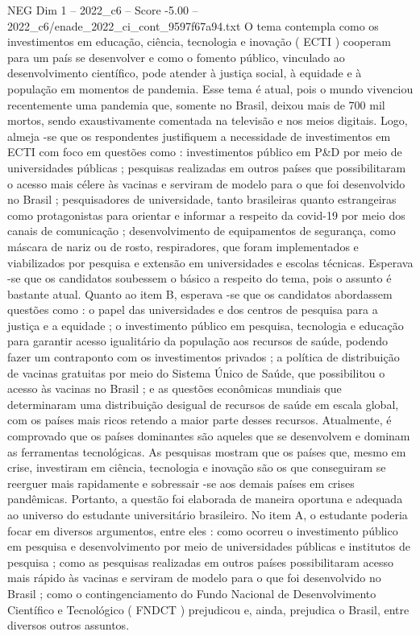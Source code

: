 \begin{textsample}{NEG Dim 1 – 2022\_c6 – Score -5.00 – 2022\_c6/enade\_2022\_ci\_cont\_9597f67a94.txt}
O tema contempla como os investimentos em educação, ciência, tecnologia e inovação ( ECTI ) cooperam para um país se desenvolver e como o fomento público, vinculado ao desenvolvimento científico, pode atender à justiça social, à equidade e à população em momentos de pandemia.
Esse tema é atual, pois o mundo vivenciou recentemente uma pandemia que, somente no Brasil, deixou mais de 700 mil mortos, sendo exaustivamente comentada na televisão e nos meios digitais.
Logo, almeja -se que os respondentes justifiquem a necessidade de investimentos em ECTI com foco em questões como : investimentos público em P\&D por meio de universidades públicas ; pesquisas realizadas em outros países que possibilitaram o acesso mais célere às vacinas e serviram de modelo para o que foi desenvolvido no Brasil ; pesquisadores de universidade, tanto brasileiras quanto estrangeiras como protagonistas para orientar e informar a respeito da covid-19 por meio dos canais de comunicação ; desenvolvimento de equipamentos de segurança, como máscara de nariz ou de rosto, respiradores, que foram implementados e viabilizados por pesquisa e extensão em universidades e escolas técnicas.
Esperava -se que os candidatos soubessem o básico a respeito do tema, pois o assunto é bastante atual.
Quanto ao item B, esperava -se que os candidatos abordassem questões como : o papel das universidades e dos centros de pesquisa para a justiça e a equidade ; o investimento público em pesquisa, tecnologia e educação para garantir acesso igualitário da população aos recursos de saúde, podendo fazer um contraponto com os investimentos privados ; a política de distribuição de vacinas gratuitas por meio do Sistema Único de Saúde, que possibilitou o acesso às vacinas no Brasil ; e as questões econômicas mundiais que determinaram uma distribuição desigual de recursos de saúde em escala global, com os países mais ricos retendo a maior parte desses recursos.
Atualmente, é comprovado que os países dominantes são aqueles que se desenvolvem e dominam as ferramentas tecnológicas.
As pesquisas mostram que os países que, mesmo em crise, investiram em ciência, tecnologia e inovação são os que conseguiram se reerguer mais rapidamente e sobressair -se aos demais países em crises pandêmicas.
Portanto, a questão foi elaborada de maneira oportuna e adequada ao universo do estudante universitário brasileiro.
No item A, o estudante poderia focar em diversos argumentos, entre eles : como ocorreu o investimento público em pesquisa e desenvolvimento por meio de universidades públicas e institutos de pesquisa ; como as pesquisas realizadas em outros países possibilitaram acesso mais rápido às vacinas e serviram de modelo para o que foi desenvolvido no Brasil ; como o contingenciamento do Fundo Nacional de Desenvolvimento Científico e Tecnológico ( FNDCT ) prejudicou e, ainda, prejudica o Brasil, entre diversos outros assuntos.

\end{textsample}
